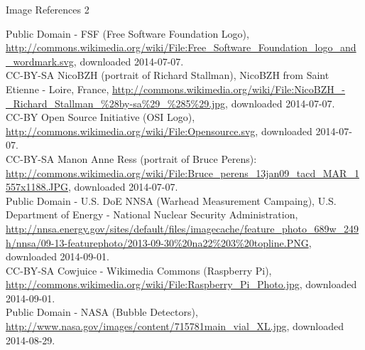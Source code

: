\documentclass[presentation]{beamer}
\begin{document}
\begin{frame}[label=sec-7-2]{Image References 2}
\fontsize{3pt}{3.6}\selectfont

Public Domain - FSF (Free Software Foundation Logo), \url{http://commons.wikimedia.org/wiki/File:Free_Software_Foundation_logo_and_wordmark.svg}, downloaded 2014-07-07.\\[0.3em]

CC-BY-SA NicoBZH (portrait of Richard Stallman), NicoBZH from Saint Etienne - Loire, France, \url{http://commons.wikimedia.org/wiki/File:NicoBZH_-_Richard_Stallman_\%28by-sa\%29_\%285\%29.jpg}, downloaded 2014-07-07.\\[0.3em]

CC-BY Open Source Initiative (OSI Logo), \url{http://commons.wikimedia.org/wiki/File:Opensource.svg}, downloaded 2014-07-07.\\[0.3em]

CC-BY-SA Manon Anne Ress (portrait of Bruce Perens): \url{http://commons.wikimedia.org/wiki/File:Bruce_perens_13jan09_tacd_MAR_1557x1188.JPG}, downloaded 2014-07-07.\\[0.3em]

Public Domain - U.S. DoE NNSA (Warhead Measurement Campaing), U.S. Department of Energy - National Nuclear Security Administration, \url{http://nnsa.energy.gov/sites/default/files/imagecache/feature_photo_689w_249h/nnsa/09-13-featurephoto/2013-09-30\%20na22\%203\%20topline.PNG}, downloaded 2014-09-01.\\[0.3em]

CC-BY-SA Cowjuice - Wikimedia Commons (Raspberry Pi), \url{http://commons.wikimedia.org/wiki/File:Raspberry_Pi_Photo.jpg}, downloaded 2014-09-01.\\[0.3em]


Public Domain - NASA (Bubble Detectors), \url{http://www.nasa.gov/images/content/715781main_vial_XL.jpg}, downloaded 2014-08-29.\\[0.3em]
\end{frame}




\begin{frame}[label=sec-7-3]{}

\end{frame}
\end{document}
